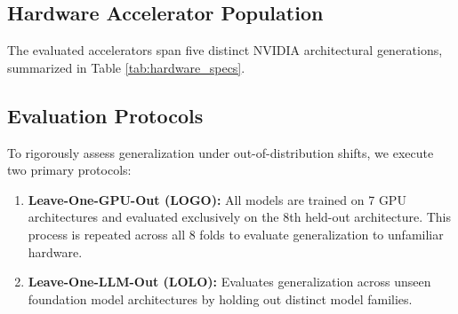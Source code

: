 \documentclass[preprint,12pt]{elsarticle}
\begin{document}
\subsection{Hardware Accelerator Population}
The evaluated accelerators span five distinct NVIDIA architectural generations, summarized in Table \ref{tab:hardware_specs}.

\begin{table}[h]
\centering
\caption{Microarchitectural specifications of evaluated server-grade GPU hardware population.}
\label{tab:hardware_specs}
\end{table}

\subsection{Evaluation Protocols}
To rigorously assess generalization under out-of-distribution shifts, we execute two primary protocols:
\begin{enumerate}
    \item \textbf{Leave-One-GPU-Out (LOGO):} All models are trained on 7 GPU architectures and evaluated exclusively on the 8th held-out architecture. This process is repeated across all 8 folds to evaluate generalization to unfamiliar hardware.
    \item \textbf{Leave-One-LLM-Out (LOLO):} Evaluates generalization across unseen foundation model architectures by holding out distinct model families.
\end{enumerate}
\end{document}
